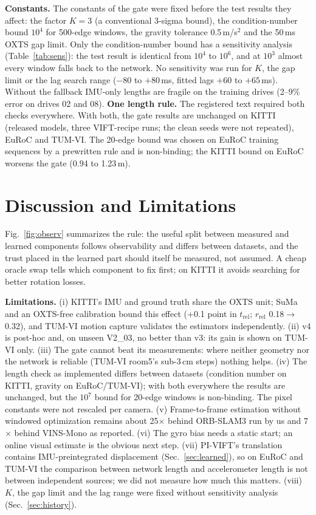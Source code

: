 \documentclass[letterpaper,journal]{IEEEtran}
\begin{document}
\textbf{Constants.} The constants of the gate were fixed before the test results they affect: the factor $K=3$ (a conventional 3-sigma bound), the condition-number bound $10^4$ for 500-edge windows, the gravity tolerance 0.5\,m/s$^2$ and the 50\,ms OXTS gap limit. Only the condition-number bound has a sensitivity analysis (Table~\ref{tab:sens}): the test result is identical from $10^4$ to $10^6$, and at $10^3$ almost every window falls back to the network. No sensitivity was run for $K$, the gap limit or the lag search range ($-80$ to $+80$\,ms, fitted lags $+60$ to $+65$\,ms). Without the fallback IMU-only lengths are fragile on the training drives (2--9\% error on drives 02 and 08). \textbf{One length rule.} The registered text required both checks everywhere. With both, the gate results are unchanged on KITTI (released models, three VIFT-recipe runs; the clean seeds were not repeated), EuRoC and TUM-VI. The 20-edge bound was chosen on EuRoC training sequences by a prewritten rule and is non-binding; the KITTI bound on EuRoC worsens the gate (0.94 to 1.23\,m).

\section{Discussion and Limitations}

Fig.~\ref{fig:observ} summarizes the rule: the useful split between measured and learned components follows observability and differs between datasets, and the trust placed in the learned part should itself be measured, not assumed. A cheap oracle swap tells which component to fix first; on KITTI it avoids searching for better rotation losses.

\textbf{Limitations.} (i) KITTI's IMU and ground truth share the OXTS unit; SuMa and an OXTS-free calibration bound this effect (+0.1 point in $t_\mathrm{rel}$; $r_\mathrm{rel}$ 0.18$\to$0.32), and TUM-VI motion capture validates the estimators independently. (ii) v4 is post-hoc and, on unseen V2\_03, no better than v3: its gain is shown on TUM-VI only. (iii) The gate cannot beat its measurements: where neither geometry nor the network is reliable (TUM-VI room5's sub-3\,cm steps) nothing helps. (iv) The length check as implemented differs between datasets (condition number on KITTI, gravity on EuRoC/TUM-VI); with both everywhere the results are unchanged, but the $10^7$ bound for 20-edge windows is non-binding. The pixel constants were not rescaled per camera. (v) Frame-to-frame estimation without windowed optimization remains about 25$\times$ behind ORB-SLAM3 run by us and 7$\times$ behind VINS-Mono as reported. (vi) The gyro bias needs a static start; an online visual estimate is the obvious next step. (vii) PI-VIFT's translation contains IMU-preintegrated displacement (Sec.~\ref{sec:learned}), so on EuRoC and TUM-VI the comparison between network length and accelerometer length is not between independent sources; we did not measure how much this matters. (viii) $K$, the gap limit and the lag range were fixed without sensitivity analysis (Sec.~\ref{sec:history}).
\end{document}
